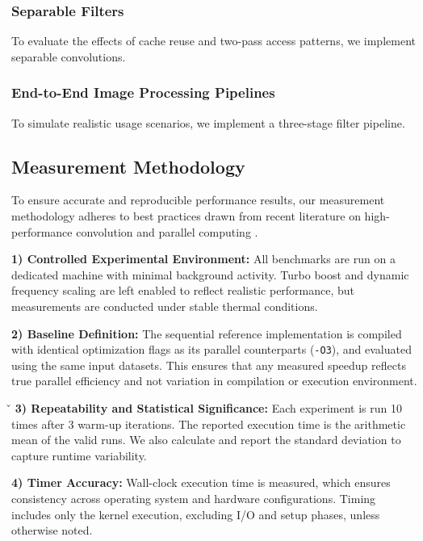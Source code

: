 \documentclass[conference, 10pt]{IEEEtran}
\begin{document}
\subsubsection{\textbf{Separable Filters}}

To evaluate the effects of cache reuse and two-pass access patterns, we implement separable convolutions.



\subsubsection{\textbf{End-to-End Image Processing Pipelines}}

To simulate realistic usage scenarios, we implement a three-stage filter pipeline.



\subsection{\textbf{Measurement Methodology}}

To ensure accurate and reproducible performance results, our measurement methodology adheres to best practices drawn from recent literature on high-performance convolution and parallel computing \cite{Gawrych2023,  Rajput2013,  Yoon2012}.

\vspace{0.5em}
\textbf{1) Controlled Experimental Environment:} All benchmarks are run on a dedicated machine with minimal background activity. Turbo boost and dynamic frequency scaling are left enabled to reflect realistic performance, but measurements are conducted under stable thermal conditions.

\vspace{0.5em}
\textbf{2) Baseline Definition:} The sequential reference implementation is compiled with identical optimization flags as its parallel counterparts (\texttt{-O3}), and evaluated using the same input datasets. This ensures that any measured speedup reflects true parallel efficiency and not variation in compilation or execution environment.

\v\vspace{0.5em}
\textbf{3) Repeatability and Statistical Significance:} Each experiment is run 10 times after 3 warm-up iterations. The reported execution time is the arithmetic mean of the valid runs. We also calculate and report the standard deviation to capture runtime variability.

\vspace{0.5em}
\textbf{4) Timer Accuracy:} Wall-clock execution time is measured, which ensures consistency across operating system and hardware configurations. Timing includes only the kernel execution, excluding I/O and setup phases, unless otherwise noted.
\end{document}

